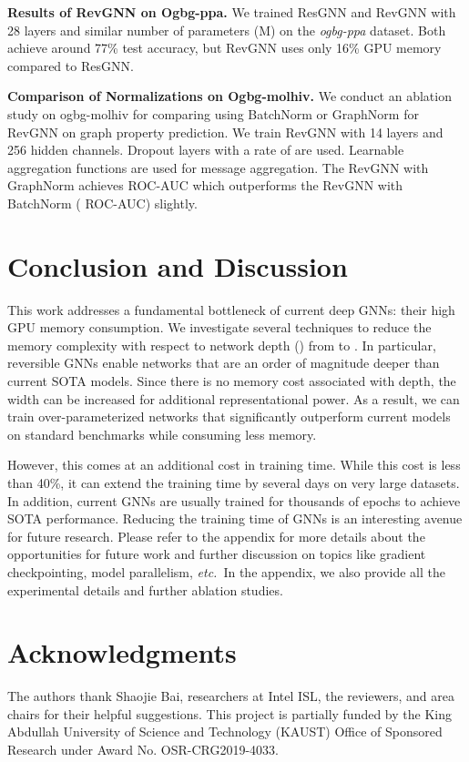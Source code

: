 \documentclass{article}
\newcommand{\etc}{\emph{etc.\xspace}}
\newcommand{\mysection}[1]{\vspace{0pt}\noindent\textbf{#1.}}
\begin{document}
\mysection{Results of RevGNN on Ogbg-ppa} 
We trained ResGNN and RevGNN with 28 layers and similar number of parameters (M) on the \emph{ogbg-ppa} dataset. Both achieve around 77\% test accuracy, but RevGNN uses only 16\% GPU memory compared to ResGNN.

\mysection{Comparison of Normalizations on Ogbg-molhiv}
We conduct an ablation study on ogbg-molhiv for comparing using BatchNorm \citep{ioffe2015batch} or GraphNorm \citep{cai2020graphnorm} for RevGNN on graph property prediction. We train RevGNN with 14 layers and 256 hidden channels. Dropout layers with a rate of  are used. Learnable  aggregation functions \citep{li2020deepergcn} are used for message aggregation. The RevGNN with GraphNorm achieves  ROC-AUC which outperforms the RevGNN with BatchNorm ( ROC-AUC) slightly.

\section{Conclusion and Discussion}
This work addresses a fundamental bottleneck of current deep GNNs: their high GPU memory consumption. We investigate several techniques to reduce the memory complexity with respect to network depth () from  to . In particular, reversible GNNs enable networks that are an order of magnitude deeper than current SOTA models. Since there is no memory cost associated with depth, the width can be increased for additional representational power. As a result, we can train over-parameterized networks that significantly outperform current models  on standard benchmarks while consuming less memory.

However, this comes at an additional cost in training time. While this cost is less than 40\%, it can extend the training time by several days on very large datasets. In addition, current GNNs are usually trained for thousands of epochs to achieve SOTA performance. Reducing the training time of GNNs is an interesting avenue for future research. Please refer to the appendix for more details about the opportunities for future work and further discussion on topics like gradient checkpointing, model parallelism, \etc~In the appendix, we also provide all the experimental details and further ablation studies.

\section*{Acknowledgments}
The authors thank Shaojie Bai, researchers at Intel ISL, the reviewers, and area chairs for their helpful suggestions. This project is partially funded by the King Abdullah University of Science and Technology (KAUST) Office of Sponsored Research under Award No. OSR-CRG2019-4033. 
\end{document}
